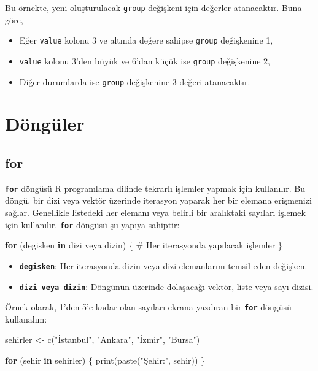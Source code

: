 \documentclass[
  letterpaper,
  DIV=11,
  numbers=noendperiod]{scrreprt}
\newenvironment{Shaded}{\begin{snugshade}}{\end{snugshade}}
\newcommand{\CommentTok}[1]{\textcolor[rgb]{0.37,0.37,0.37}{#1}}
\newcommand{\ControlFlowTok}[1]{\textcolor[rgb]{0.00,0.23,0.31}{\textbf{#1}}}
\newcommand{\FunctionTok}[1]{\textcolor[rgb]{0.28,0.35,0.67}{#1}}
\newcommand{\NormalTok}[1]{\textcolor[rgb]{0.00,0.23,0.31}{#1}}
\newcommand{\OtherTok}[1]{\textcolor[rgb]{0.00,0.23,0.31}{#1}}
\newcommand{\StringTok}[1]{\textcolor[rgb]{0.13,0.47,0.30}{#1}}
\begin{document}
Bu örnekte, yeni oluşturulacak \texttt{group} değişkeni için değerler
atanacaktır. Buna göre,

\begin{itemize}
\item
  Eğer \texttt{value} kolonu 3 ve altında değere sahipse \texttt{group}
  değişkenine 1,
\item
  \texttt{value} kolonu 3'den büyük ve 6'dan küçük ise \texttt{group}
  değişkenine 2,
\item
  Diğer durumlarda ise \texttt{group} değişkenine 3 değeri atanacaktır.
\end{itemize}

\section{Döngüler}\label{duxf6nguxfcler}

\subsection{for}\label{for}

\textbf{\texttt{for}} döngüsü R programlama dilinde tekrarlı işlemler
yapmak için kullanılır. Bu döngü, bir dizi veya vektör üzerinde
iterasyon yaparak her bir elemana erişmenizi sağlar. Genellikle
listedeki her elemanı veya belirli bir aralıktaki sayıları işlemek için
kullanılır. \textbf{\texttt{for}} döngüsü şu yapıya sahiptir:

\begin{Shaded}
\begin{Highlighting}[]
\ControlFlowTok{for}\NormalTok{ (degisken }\ControlFlowTok{in}\NormalTok{ dizi veya dizin) \{}
  \CommentTok{\# Her iterasyonda yapılacak işlemler}
\NormalTok{\}}
\end{Highlighting}
\end{Shaded}

\begin{itemize}
\item
  \textbf{\texttt{degisken}}: Her iterasyonda dizin veya dizi
  elemanlarını temsil eden değişken.
\item
  \textbf{\texttt{dizi\ veya\ dizin}}: Döngünün üzerinde dolaşacağı
  vektör, liste veya sayı dizisi.
\end{itemize}

Örnek olarak, 1'den 5'e kadar olan sayıları ekrana yazdıran bir
\textbf{\texttt{for}} döngüsü kullanalım:

\begin{Shaded}
\begin{Highlighting}[]
\NormalTok{sehirler }\OtherTok{\textless{}{-}} \FunctionTok{c}\NormalTok{(}\StringTok{"İstanbul"}\NormalTok{, }\StringTok{"Ankara"}\NormalTok{, }\StringTok{"İzmir"}\NormalTok{, }\StringTok{"Bursa"}\NormalTok{)}

\ControlFlowTok{for}\NormalTok{ (sehir }\ControlFlowTok{in}\NormalTok{ sehirler) \{}
  \FunctionTok{print}\NormalTok{(}\FunctionTok{paste}\NormalTok{(}\StringTok{"Şehir:"}\NormalTok{, sehir))}
\NormalTok{\}}
\end{Highlighting}
\end{Shaded}
\end{document}
